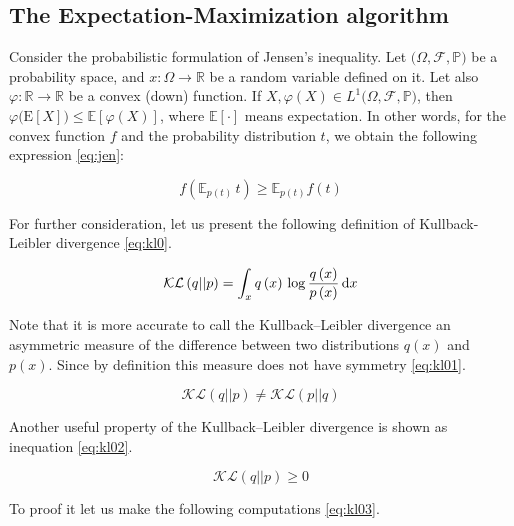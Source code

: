\documentclass[12pt]{report}
\theoremstyle{definition}
\begin{document}
\subsection{The Expectation-Maximization algorithm}

Consider the probabilistic formulation of Jensen's inequality.
Let $\big(\Omega,\mathcal{F},\mathbb{P}\big)$ be a probability space, and $x\colon\Omega \to \mathbb{R}$ be a random variable defined on it. 
Let also $\varphi\colon\mathbb{R} \to \mathbb{R}$ be a convex (down) function. 
If $X, \varphi \left( X \right) \in L^1 \big(\Omega,\mathcal{F},\mathbb{P}\big)$, then $\varphi \big(\mathrm{E}[X] \big) \leqslant \mathbb{E}[\varphi (X)]$, where $\mathbb{E}[\cdot]$ means expectation. 
In other words, for the convex function $f$ and the probability distribution $t$, we obtain the following expression \ref{eq:jen}:

\begin{equation} \label{eq:jen}
f \left( \mathbb{E}_{p \left( t \right) } \, t \right) \geqslant \mathbb{E}_{p \left( t \right)} f \left( t \right)
\end{equation}

For further consideration, let us present the following definition of Kullback-Leibler divergence \ref{eq:kl0}.

\begin{equation} \label{eq:kl0}
\mathcal{KL} \left( q\vert \vert p \right)  = \int_x q \left(  x  \right)  \, \log \frac{q \left(  x \right) }{p \left(   x \right) } \, {\rm d}x
\end{equation}

Note that it is more accurate to call the Kullback–Leibler divergence an asymmetric measure of the difference between two distributions $q \left( x \right)$ and $p \left(x \right)$.
Since by definition this measure does not have symmetry \ref{eq:kl01}.

\begin{equation} \label{eq:kl01}
\mathcal{KL}  \left( q \vert \vert p \right)  \neq \mathcal{KL}  \left( p\vert \vert q \right) 
\end{equation}

Another useful property of the Kullback–Leibler divergence is shown as inequation \ref{eq:kl02}.

\begin{equation} \label{eq:kl02}
 \mathcal{KL} \left( q \vert \vert p \right) \geqslant 0
\end{equation}

To proof it let us make the following computations \ref{eq:kl03}.
\end{document}
